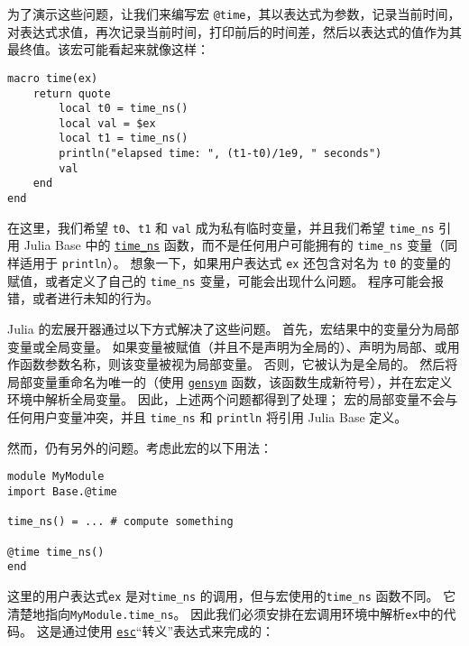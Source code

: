 为了演示这些问题，让我们来编写宏 \texttt{@time}，其以表达式为参数，记录当前时间，对表达式求值，再次记录当前时间，打印前后的时间差，然后以表达式的值作为其最终值。该宏可能看起来就像这样：




\begin{verbatim}
macro time(ex)
    return quote
        local t0 = time_ns()
        local val = $ex
        local t1 = time_ns()
        println("elapsed time: ", (t1-t0)/1e9, " seconds")
        val
    end
end
\end{verbatim}



在这里，我们希望 \texttt{t0}、\texttt{t1} 和 \texttt{val} 成为私有临时变量，并且我们希望 \texttt{time\_ns} 引用 Julia Base 中的 \hyperlink{3638234932564609978}{\texttt{time\_ns}} 函数，而不是任何用户可能拥有的 \texttt{time\_ns} 变量（同样适用于 \texttt{println}）。 想象一下，如果用户表达式 \texttt{ex} 还包含对名为 \texttt{t0} 的变量的赋值，或者定义了自己的 \texttt{time\_ns} 变量，可能会出现什么问题。 程序可能会报错，或者进行未知的行为。



Julia 的宏展开器通过以下方式解决了这些问题。 首先，宏结果中的变量分为局部变量或全局变量。 如果变量被赋值（并且不是声明为全局的）、声明为局部、或用作函数参数名称，则该变量被视为局部变量。 否则，它被认为是全局的。 然后将局部变量重命名为唯一的（使用 \hyperlink{3515345868651201289}{\texttt{gensym}} 函数，该函数生成新符号），并在宏定义环境中解析全局变量。 因此，上述两个问题都得到了处理； 宏的局部变量不会与任何用户变量冲突，并且 \texttt{time\_ns} 和 \texttt{println} 将引用 Julia Base 定义。



然而，仍有另外的问题。考虑此宏的以下用法：




\begin{verbatim}
module MyModule
import Base.@time

time_ns() = ... # compute something

@time time_ns()
end
\end{verbatim}



这里的用户表达式\texttt{ex} 是对\texttt{time\_ns} 的调用，但与宏使用的\texttt{time\_ns} 函数不同。 它清楚地指向\texttt{MyModule.time\_ns}。 因此我们必须安排在宏调用环境中解析\texttt{ex}中的代码。 这是通过使用 \hyperlink{17861659594346526773}{\texttt{esc}}“转义”表达式来完成的：




